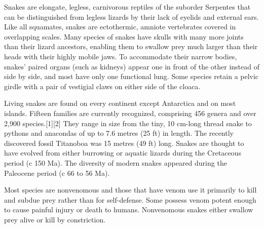 Snakes are elongate, legless, carnivorous reptiles of the suborder Serpentes
that can be distinguished from legless lizards by their lack of eyelids and
external ears. Like all squamates, snakes are ectothermic, amniote vertebrates
covered in overlapping scales. Many species of snakes have skulls with many
more joints than their lizard ancestors, enabling them to swallow prey much
larger than their heads with their highly mobile jaws. To accommodate their
narrow bodies, snakes' paired organs (such as kidneys) appear one in front of
the other instead of side by side, and most have only one functional lung. Some
species retain a pelvic girdle with a pair of vestigial claws on either side of
the cloaca.

Living snakes are found on every continent except Antarctica and on most
islands. Fifteen families are currently recognized, comprising 456 genera and
over 2,900 species.[1][2] They range in size from the tiny, 10 cm-long thread
snake to pythons and anacondas of up to 7.6 metres (25 ft) in length. The
recently discovered fossil Titanoboa was 15 metres (49 ft) long. Snakes are
thought to have evolved from either burrowing or aquatic lizards during the
Cretaceous period (c 150 Ma). The diversity of modern snakes appeared during
the Paleocene period (c 66 to 56 Ma).

Most species are nonvenomous and those that have venom use it primarily to kill
and subdue prey rather than for self-defense. Some possess venom potent enough
to cause painful injury or death to humans. Nonvenomous snakes either swallow
prey alive or kill by constriction.
